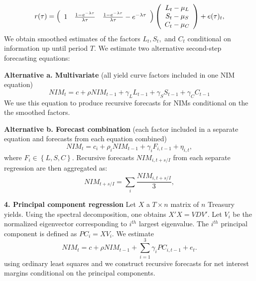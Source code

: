 \documentclass[11pt]{article}
\begin{document}
\[
r(\tau )=\left(
\begin{array}{ccc}
1 & \frac{1-e^{-\lambda \tau }}{\lambda \tau } & \frac{1-e^{-\lambda \tau }}{%
\lambda \tau }-e^{-\lambda \tau }%
\end{array}%
\right) \left(
\begin{array}{c}
{L_{t}-\mu _{L}} \\
{S_{t}-\mu _{S}} \\
{C_{t}-\mu _{C}} 
\end{array}%
\right) +e(\tau )_{t},
\]
We obtain smoothed estimates of the factors $L_{t},S_{t},$ and $C_{t}$ conditional on information up until period $T.$ We estimate two alternative second-step forecasting equations:

\noindent \textbf{Alternative a. Multivariate} (all yield curve factors included in one NIM equation)
\[
NIM_{t}=c+\rho NIM_{t-1}+\gamma _{L}L_{t-1}+\gamma _{S}S_{t-1}+\gamma
_{C}C_{t-1}
\]
We use this equation to produce recursive forecasts for NIMs conditional on the the smoothed factors.

\noindent \textbf{Alternative b. Forecast combination} (each factor included in a separate equation and forecasts from each equation combined)
\[
NIM_{t}=c_{i}+\rho _{i}NIM_{t-1}+\gamma _{i}F_{i,t-1}+{\eta _{i,t},}
\]%
where $F_{i}\in \left\{ L,S,C\right\}.$ Recursive forecasts $NIM_{i,t+s/I}$ from each separate regression are then aggregated as:
\[
NIM_{t+s/I}=\sum_{i}\frac{NIM_{i,t+s/I}}{3},
\]

\textbf{4. Principal component regression}
Let $X$ a $T \times n$ matrix of $n$ Treasury yields.  Using the spectral decomposition, one obtains $X'X = VDV'$. Let $V_i$ be the normalized eigenvector corresponding to $i^{th}$ largest eigenvalue.
The $i^{th}$ principal component is defined as $PC_i = XV_i$. We estimate
\begin{equation*}
NIM_t = c + \rho NIM_{t-1} + \sum_{i=1}^3 \gamma_i PC_{i,t-1} + e_t.
\end{equation*}
using ordinary least squares and we construct recursive forecasts for net interest margins conditional on the principal components.
\end{document}
